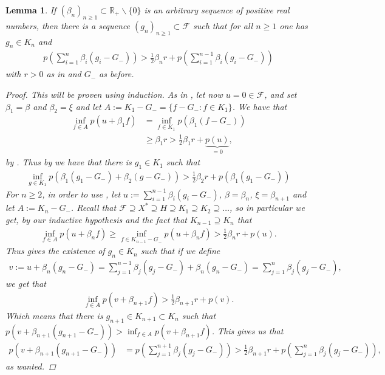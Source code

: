 \documentclass[10pt,twoside,openany,final]{memoir}
\theoremstyle{break}
\newtheorem{lemma}[section]{Lemma}
\theoremstyle{Break}
\newcommand{\R}{\mathbb{R}}
\begin{document}
\begin{lemma} \label{pryce 5}
If $(\beta_{n})_{n\geq 1} \subset \R_{+} \backslash \{0\}$ is an arbitrary sequence of positive real numbers, then there is a sequence $(g_{n})_{n \geq 1} \subset \mathcal{F}$ such that for all $n \geq 1$ one has $g_{n} \in K_{n}$ and
\begin{align*}
p\left( \sum_{i=1}^n \beta_{i} (g_{i} - G_{-}) \right) > \frac12 \beta_{n} r + p\left(\sum_{i=1}^{n-1} \beta_{i}(g_{i}-G_{-}) \right)
\end{align*}
with $r >0$ as in  and $G_{-}$ as before. 
\begin{proof}
This will be proven using induction. As in , let now $u=0 \in \mathcal{F}$, and set $\beta_{1}=\beta$ and $\beta_{2}=\xi$ and let $A:=K_{1}-G_{-}=\{ f-G_{-}: f \in K_{1}\}$. We have that
\begin{align*}
\inf_{f \in A} p(u+\beta_{1} f) &= \inf_{f \in K_{1}} p(\beta_{1}(f-G_{-}))\\
&\geq \beta_{1} r > \frac{1}{2} \beta_{1} r + \underbrace{p(u)}_{=0},
\end{align*}
by . Thus by  we have that there is $g_{1} \in K_{1}$ such that
\begin{align*}
\inf_{g \in K_{1}} p(\beta_{1}(g_{1}-G_{-})+\beta_{2}(g-G_{-})) > \frac12 \beta_{2} r + p(\beta_{1}(g_{1}-G_{-}))
\end{align*}  
For $n \geq 2$, in order to use , let $u:= \sum_{i=1}^{n-1} \beta_{i}(g_{i}-G_{-})$,  $\beta=\beta_{n}$, $\xi=\beta_{n+1}$ and let $A:= K_{n}-G_{-}$. Recall that $\mathcal{F} \supseteq X^*\supseteq H \supseteq K_{1} \supseteq K_{2} \supseteq \dots $, so in particular we get, by our inductive hypothesis and the fact that $K_{n-1} \supseteq K_{n}$ that
\begin{align*}
\inf_{f \in A} p(u+\beta_{n} f) \geq \inf_{f \in K_{n-1}-G_{-}} p(u+\beta_{n} f) > \frac{1}{2} \beta_{n} r + p(u).
\end{align*}
Thus  gives the existence of $g_{n} \in K_{n}$ such that if we define 
\begin{align*}
v:=u+\beta_{n}(g_{n}-G_{-})=\sum_{j=1}^{n-1} \beta_{j}(g_{j}-G_{-})+\beta_{n}(g_{n}-G_{-})=\sum_{j=1}^n \beta_{j}(g_{j}-G_{-}),
\end{align*}
we get that
\begin{align*}
\inf_{f \in A} p(v+\beta_{n+1} f) > \frac12 \beta_{n+1} r+ p(v).
\end{align*}
Which means that there is $g_{n+1} \in K_{n+1}\subset K_{n}$ such that $p(v+\beta_{n+1}(g_{n+1}-G_{-})) > \inf_{f \in  A} p(v+\beta_{n+1} f)$. This gives us that
\begin{align*}
p\left(v+\beta_{n+1}(g_{n+1}-G_{-})\right)&=p\left(\sum_{j=1}^{n+1} \beta_{j}(g_{j}-G_{-})\right) > \frac12 \beta_{n+1} r+p\left(\sum_{j=1}^n \beta_{j}(g_{j}-G_{-})\right),
\end{align*}
as wanted.
\end{proof}
\end{lemma}
\end{document}
